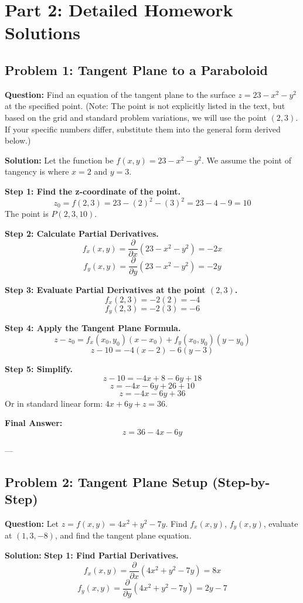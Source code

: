 \documentclass{article}
\begin{document}
\newpage
\section{Part 2: Detailed Homework Solutions}

\subsection*{Problem 1: Tangent Plane to a Paraboloid}
\textbf{Question:} Find an equation of the tangent plane to the surface $z = 23 - x^2 - y^2$ at the specified point. (Note: The point is not explicitly listed in the text, but based on the grid and standard problem variations, we will use the point $(2, 3)$. If your specific numbers differ, substitute them into the general form derived below.)

\textbf{Solution:}
Let the function be $f(x, y) = 23 - x^2 - y^2$.
We assume the point of tangency is where $x=2$ and $y=3$.

\textbf{Step 1: Find the z-coordinate of the point.}
\[ z_0 = f(2, 3) = 23 - (2)^2 - (3)^2 = 23 - 4 - 9 = 10 \]
The point is $P(2, 3, 10)$.

\textbf{Step 2: Calculate Partial Derivatives.}
\[ f_x(x, y) = \frac{\partial}{\partial x}(23 - x^2 - y^2) = -2x \]
\[ f_y(x, y) = \frac{\partial}{\partial y}(23 - x^2 - y^2) = -2y \]

\textbf{Step 3: Evaluate Partial Derivatives at the point $(2, 3)$.}
\[ f_x(2, 3) = -2(2) = -4 \]
\[ f_y(2, 3) = -2(3) = -6 \]

\textbf{Step 4: Apply the Tangent Plane Formula.}
\[ z - z_0 = f_x(x_0, y_0)(x - x_0) + f_y(x_0, y_0)(y - y_0) \]
\[ z - 10 = -4(x - 2) - 6(y - 3) \]

\textbf{Step 5: Simplify.}
\[ z - 10 = -4x + 8 - 6y + 18 \]
\[ z = -4x - 6y + 26 + 10 \]
\[ z = -4x - 6y + 36 \]
Or in standard linear form: $4x + 6y + z = 36$.

\textbf{Final Answer:} \[ z = 36 - 4x - 6y \]

---

\subsection*{Problem 2: Tangent Plane Setup (Step-by-Step)}
\textbf{Question:} Let $z = f(x, y) = 4x^2 + y^2 - 7y$. Find $f_x(x, y)$, $f_y(x, y)$, evaluate at $(1, 3, -8)$, and find the tangent plane equation.

\textbf{Solution:}
\textbf{Step 1: Find Partial Derivatives.}
\[ f_x(x, y) = \frac{\partial}{\partial x}(4x^2 + y^2 - 7y) = 8x \]
\[ f_y(x, y) = \frac{\partial}{\partial y}(4x^2 + y^2 - 7y) = 2y - 7 \]
\end{document}
